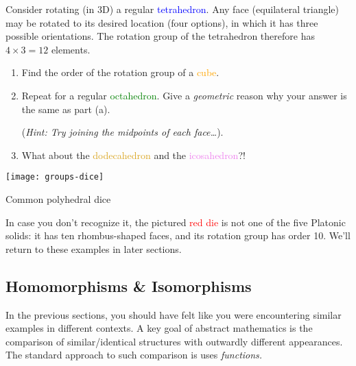 \begin{exercises}
\begin{enumerate}
	  \begin{minipage}[t]{0.69\linewidth}\vspace{0pt}
	    \item\label{exs:dnddice} Consider rotating (in 3D) a regular \textcolor{blue}{tetrahedron}. Any face (equilateral triangle) may be rotated to its desired location (four options), in which it has three possible orientations. The rotation group of the tetrahedron therefore has $4\times 3=12$ elements.
	  	\begin{enumerate}\itemsep0pt
	    	\item Find the order of the rotation group of a \textcolor{orange}{cube}.
	    	\item Repeat for a regular \textcolor{Green}{octahedron}. Give a \emph{geometric} reason why your answer is the same as part (a).\par
	    	(\emph{Hint: Try joining the midpoints of each face\ldots}).
	    	\item What about the \textcolor{Goldenrod}{dodecahedron} and the \textcolor{violet}{icosahedron}?!
	  	\end{enumerate}
	    \end{minipage}
	    \hfill
	   	\begin{minipage}[t]{0.29\linewidth}\vspace{0pt}
	  		\flushright\texttt{[image: groups-dice]}\par
	  		\centering Common polyhedral dice
	    \end{minipage}\medbreak
	    In case you don't recognize it, the pictured \textcolor{red}{red die} is not one of the five Platonic solids: it has ten rhombus-shaped faces, and its rotation group has order 10. We'll return to these examples in later sections.
	  
	\end{enumerate}
\end{exercises}


\clearpage


\subsection{Homomorphisms \& Isomorphisms}\label{sec:morph}

In the previous sections, you should have felt like you were encountering similar examples in different contexts. A key goal of abstract mathematics is the comparison of similar/identical structures with outwardly different appearances. The standard approach to such comparison is uses \emph{functions.}

